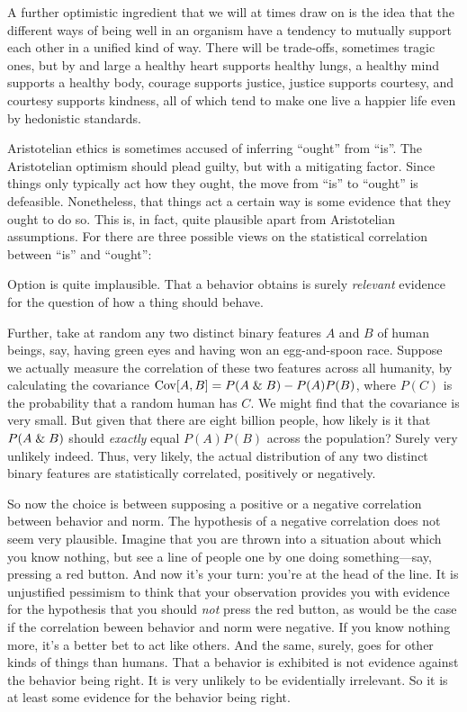 A further optimistic ingredient that we will at times draw on is the idea that the different ways of being
well in an organism have a tendency to mutually support each other in a unified kind of way. There will be
trade-offs, sometimes tragic ones, but by and large a healthy heart supports healthy lungs, a healthy mind supports a healthy body,
courage supports justice, justice supports courtesy, and courtesy supports kindness, all of which tend to make
one live a happier life even by hedonistic standards. 

Aristotelian ethics is sometimes accused of inferring ``ought'' from ``is''. The Aristotelian optimism should plead
guilty, but with a mitigating factor. Since things only typically act how they ought, the move from ``is'' to ``ought''
is defeasible. Nonetheless, that things act a certain way is some evidence that they ought to do so. This is, in fact,
quite plausible apart from Aristotelian assumptions. For there are three possible views on the statistical correlation
between ``is'' and ``ought'':

Option  is quite implausible. That a behavior obtains is surely \textit{relevant} evidence for
the question of how a thing should behave. 

Further, take at random any two distinct binary features $A$ and $B$ of human beings, say, 
having green eyes and having won an egg-and-spoon race. Suppose we actually measure the correlation of these two features 
across all humanity, by calculating the covariance $\operatorname{Cov}[A,B]=P(A\mathrel{\&} B)-P(A)P(B)$, where $P(C)$ is the probability that a random human has
$C$. We might find that the covariance is very small. But given that there are eight billion people, how likely is it that $P(A\mathrel{\&} B)$ should
\textit{exactly} equal $P(A)P(B)$ across the population? Surely very unlikely indeed. Thus, very likely, the actual
distribution of any two distinct binary features
are statistically correlated, positively or negatively.

So now the choice is between supposing a positive or a negative correlation between behavior and norm. The hypothesis of a negative 
correlation does not seem very plausible. Imagine that you are thrown into a situation about which you know nothing, but see a line of people
one by one doing something---say, pressing a red button. And now it's your turn: you're at the head of the line. 
It is unjustified pessimism to think that your 
observation provides you with evidence for the hypothesis that you should \textit{not} press the red button, as would 
be the case if the correlation beween behavior and norm were negative. If you know nothing more, it's a better bet to 
act like others. And the same, surely,
goes for other kinds of things than humans. That a behavior is exhibited is not evidence against the behavior being right. It is very unlikely
to be evidentially irrelevant. So it is at least some evidence for the behavior being right.

